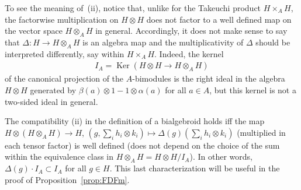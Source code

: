 \documentclass[pdftex]{sigma}
\numberwithin{equation}{section}
\begin{document}
To see the meaning of~(ii), notice that, unlike for the Takeuchi product $H\times_A H$, the factorwise multiplication on $H\otimes H$ does not factor to a well defined map on the vector space $H\otimes_A H$ in general. Accordingly, it does not make sense to say that $\Delta\colon H\to H\otimes_A H$ is an algebra map and the multiplicativity of $\Delta$ should be interpreted differently, say within $H\times_A H$. Indeed, the kernel
\begin{gather}\label{eq:IA}
I_A = \operatorname{Ker} (H\otimes H\to H\otimes_A H )
\end{gather}
of the canonical projection of the $A$-bimodules is the right ideal in the algebra $H\otimes H$ generated by $\beta(a)\otimes 1 - 1\otimes\alpha(a)$ for all $a\in A$, but this kernel is not a two-sided ideal in general.

The compatibility (ii) in the definition of a bialgebroid holds iff the map $H\otimes(H\otimes_A H)\to H$, $(g,\sum_i h_i\otimes k_i)\mapsto\Delta(g)(\sum_i h_i\otimes k_i)$ (multiplied in each tensor factor) is well defined (does not depend on the choice of the sum within
the equivalence class in $H\otimes_A H = H\otimes H/I_A$). In other words, $\Delta(g)\cdot I_A\subset I_A$ for all $g\in H$. This last characterization will be useful in the proof of Proposition~\ref{prop:FDFm}.
\end{document}
